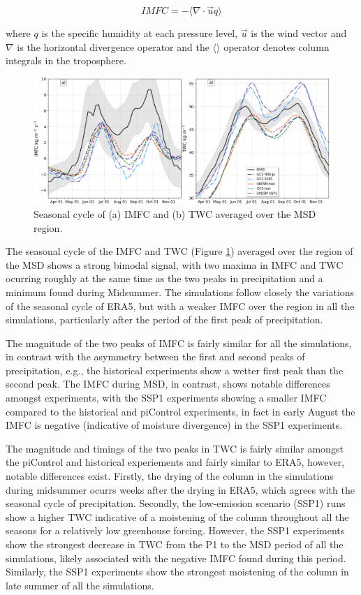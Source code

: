 \begin{equation}
IMFC=-\Bigg\langle \nabla \cdot \vec{u}q \Bigg \rangle
\label{eq:waterbudget}
\end{equation}

\noindent where $q$ is the specific humidity at each pressure level, $\vec{u}$ is the wind vector and $\nabla$ is the horizontal divergence operator and the $\langle \rangle$ operator denotes column integrals in the troposphere.


 \begin{figure}[t!]
\includegraphics[width=\linewidth]{figures/imfd_index_seasonal}
\caption[Seasonal cycle of IMFC and TWC]{Seasonal cycle of (a) IMFC and (b) TWC averaged over the MSD region.}
\label{fig:imfd_cycle}
\end{figure}

The seasonal cycle of the IMFC and TWC (Figure \ref{fig:imfd_cycle}) averaged over the region of the MSD shows a strong bimodal signal, with two maxima in IMFC and TWC ocurring roughly at the same time as the two peaks in precipitation and a minimum found during Midsummer. The simulations follow closely the variations of the seasonal cycle of ERA5, but with a weaker IMFC over the region in all the simulations, particularly after the period of the first peak of precipitation. 

The magnitude of the two peaks of IMFC is fairly similar for all the simulations, in contrast with the asymmetry between the first and second peaks of precipitation, e.g., the historical experiments show a wetter first peak than the second peak. The IMFC during MSD, in contrast, shows notable differences amongst experiments, with the SSP1 experiments showing a smaller IMFC compared to the historical and piControl experiments, in fact in early August the IMFC is negative (indicative of moisture divergence) in the SSP1 experiments.


 The magnitude and timings of the two peaks in  TWC is fairly similar amongst the piControl and historical experiements and fairly similar to ERA5, however, notable differences exist. Firstly, the drying of the column in the simulations during midsummer ocurrs weeks after the drying in ERA5, which agrees with the seasonal cycle of precipitation. Secondly, the low-emission scenario (SSP1) runs show a higher TWC indicative of a moistening of the column throughout all the seasons for a relatively low greenhouse forcing. However,  the SSP1 experiments show the strongest decrease in TWC from the P1 to the MSD period of all the simulations, likely associated with the negative IMFC found during this period. Similarly, the SSP1 experiments show the strongest moistening of the column in late summer of all the simulations.

